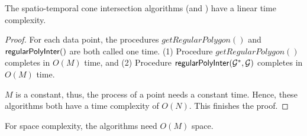 \begin{theorem}
\label{prop-cist-complexity}
The spatio-temporal cone intersection algorithms (\cist and \cista) have a linear time complexity.
\end{theorem}

\begin{proof}
For each data point, the procedures $getRegularPolygon()$ and ${\mathsf{regularPolyInter}}()$ are both called one time.
(1) Procedure $getRegularPolygon()$ completes in $O(M)$ time, and
(2) Procedure ${\mathsf{regularPolyInter}}(\mathcal{G}^*, \mathcal{G})$ completes in $O(M)$ time.

$M$ is a constant, thus, the process of a point needs a constant time. Hence, these algorithms both have a time complexity of $O(N)$.
This finishes the proof.
\end{proof}


{For space complexity, the algorithms need $O(M)$ space.}
